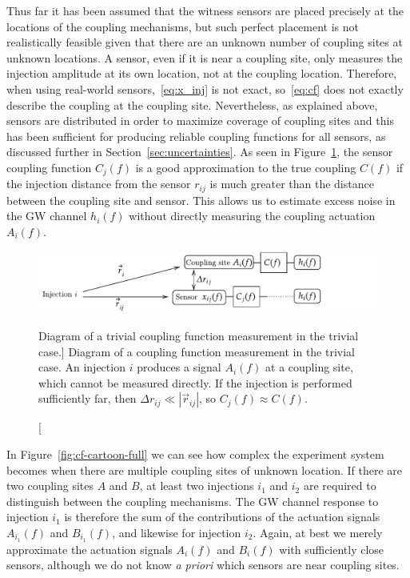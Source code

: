 Thus far it has been assumed that the witness sensors are placed precisely at the locations of the coupling mechanisms, but such perfect placement is not realistically feasible given that there are an unknown number of coupling sites at unknown locations.
A sensor, even if it is near a coupling site, only measures the injection amplitude at its own location, not at the coupling location.
Therefore, when using real-world sensors,~\cref{eq:x_inj} is not exact, so~\cref{eq:cf} does not exactly describe the coupling at the coupling site.
Nevertheless, as explained above, sensors are distributed in order to maximize coverage of coupling sites and this has been sufficient for producing reliable coupling functions for all sensors, as discussed further in Section~\ref{sec:uncertainties}.
As seen in Figure~\ref{fig:cf-cartoon-simple}, the sensor coupling function $C_j(f)$ is a good approximation to the true coupling $C(f)$ if the injection distance from the sensor $r_{ij}$ is much greater than the distance between the coupling site and sensor.
This allows us to estimate excess noise in the \ac{GW} channel $h_i(f)$ without directly measuring the coupling actuation $A_i(f)$.

\begin{figure}[h]
	\includegraphics[width=\textwidth]{figures/noise-methods/cf-cartoon-simple.pdf}
	\caption
	[Diagram of a trivial coupling function measurement in the trivial case.]
	{
		Diagram of a coupling function measurement in the trivial case.
		An injection $i$ produces a signal $A_i(f)$ at a coupling site, which cannot be measured directly.
		If the injection is performed sufficiently far, then $\Delta r_{ij} \ll |\vec{r}_{ij}|$, so $C_j(f) \approx C(f)$.
	}
	\label{fig:cf-cartoon-simple}
\end{figure}

In Figure~\ref{fig:cf-cartoon-full} we can see how complex the experiment system becomes when there are multiple coupling sites of unknown location.
If there are two coupling sites $A$ and $B$, at least two injections $i_1$ and $i_2$ are required to distinguish between the coupling mechanisms.
The \ac{GW} channel response to injection $i_1$ is therefore the sum of the contributions of the actuation signals $A_{i_1}(f)$ and $B_{i_1}(f)$, and likewise for injection ${i_2}$.
Again, at best we merely approximate the actuation signals $A_i(f)$ and $B_i(f)$ with sufficiently close sensors, although we do not know \textit{a priori} which sensors are near coupling sites.

